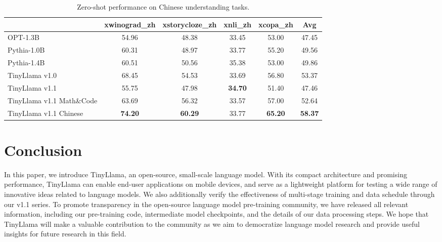 \documentclass{article}
\begin{document}
\begin{table}[htbp]
  \centering
  \scriptsize
  \caption{ 
    Zero-shot performance on Chinese understanding tasks.
  }
  \begin{tabular}{lccccc}
    \toprule
    & \textbf{xwinograd\_zh}	& \textbf{xstorycloze\_zh} &	\textbf{xnli\_zh}	& \textbf{xcopa\_zh} & \textbf{Avg} \\

    \midrule    
    OPT-1.3B\xspace      &  54.96 &  48.38 &  33.45 &  53.00 &  47.45 \\
    Pythia-1.0B\xspace      &  60.31 &  48.97 &  33.77 &  55.20 &  49.56\\
    Pythia-1.4B\xspace     &  60.51 &  50.56 &  35.38 &  53.00 &  49.86 \\
    \midrule
    TinyLlama v1.0\xspace   &  68.45 &  54.53 &  33.69 &  56.80 &  53.37  \\
    TinyLlama v1.1\xspace   &  55.75 &  47.98 &  \textbf{34.70} &  51.40 &  47.46  \\
    TinyLlama v1.1 Math\&Code\xspace    &  63.69 &  56.32 &  33.57 &  57.00 &  52.64  \\
    TinyLlama v1.1 Chinese\xspace     &  \textbf{74.20} &  \textbf{60.29} &  33.77 &  \textbf{65.20}&  \textbf{58.37} \\
    
    \bottomrule
  \end{tabular}
  \label{tab:chinese}
\end{table}



\section{Conclusion}

In this paper, we introduce TinyLlama, an open-source, small-scale language model.
With its compact architecture and promising performance, TinyLlama can enable end-user applications on mobile devices, and serve as a lightweight platform for testing a wide range of innovative ideas related to language models. We also additionally verify the effectiveness of multi-stage training and data schedule through our v1.1 series. To promote transparency in the open-source language model pre-training community, we have released all relevant information, including our pre-training code, intermediate model checkpoints, and the details of our data processing steps. We hope that TinyLlama will make a valuable contribution to the community as we aim to democratize language model research and provide useful insights for future research in this field.
\end{document}
